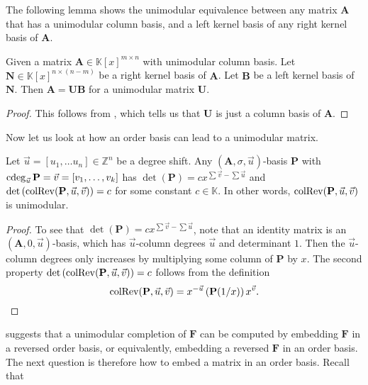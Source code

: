 The following lemma shows the unimodular equivalence between any matrix
$\mathbf{A}$ that has a unimodular column basis, and a left kernel
basis of any right kernel basis of $\mathbf{A}$.
\begin{lem}
\label{lem:unimodularEquivalenceNullspaceBasisOfNullspaceBasis}Given
a matrix $\mathbf{A}\in\mathbb{K}\left[x\right]^{m\times n}$ with
unimodular column basis. Let $\mathbf{N}\in\mathbb{K}\left[x\right]^{n\times\left(n-m\right)}$
be a right kernel basis of $\mathbf{A}$. Let $\mathbf{B}$ be a left
kernel basis of $\mathbf{N}$. Then $\mathbf{A}=\mathbf{U}\mathbf{B}$
for a unimodular matrix $\mathbf{U}$.\end{lem}
\begin{proof}
This follows from , which tells us that
$\mathbf{U}$ is just a column basis of $\mathbf{A}$.
\end{proof}
Now let us look at how an order basis can lead to a unimodular matrix. 
\begin{lem}
\label{lem:reverseOrderBasisToUnimodular}Let $\vec{u}=\left[u_{1},\dots u_{n}\right]\in\mathbb{Z}^{n}$
be a degree shift. Any $\left(\mathbf{A},\sigma,\vec{u}\right)$-basis
$\mathbf{P}$ with $\cdeg_{\vec{u}}\mathbf{P}=\vec{v}=\left[v_{1},\dots,v_{k}\right]$
has $\det\left(\mathbf{P}\right)=cx^{\sum\vec{v}-\sum\vec{u}}$ and
$\det\left(\operatorname{colRev}(\mathbf{P},\vec{u},\vec{v})\right)=c$ for some
constant $c\in\mathbb{K}$. In other words, $\operatorname{colRev}(\mathbf{P},\vec{u},\vec{v})$
is unimodular.\end{lem}
\begin{proof}
To see that $\det\left(\mathbf{P}\right)=cx^{\sum\vec{v}-\sum\vec{u}}$,
note that an identity matrix is an $\left(\mathbf{A},0,\vec{u}\right)$-basis,
which has $\vec{u}$-column degrees $\vec{u}$ and determinant $1$.
Then the $\vec{u}$-column degrees only increases by multiplying some
column of $\mathbf{P}$ by $x$. The second property $\det\left(\operatorname{colRev}(\mathbf{P},\vec{u},\vec{v})\right)=c$
follows from the definition 
\[
\operatorname{colRev}(\mathbf{P},\vec{u},\vec{v})=x^{-\vec{u}}\left(\mathbf{P}(1/x)\right)x^{\vec{v}}.
\]

\end{proof}
 suggests that a unimodular
completion of $\mathbf{F}$ can be computed by embedding $\mathbf{F}$
in a reversed order basis, or equivalently, embedding a reversed $\mathbf{F}$
in an order basis. The next question is therefore how to embed a matrix
in an order basis. Recall that 
